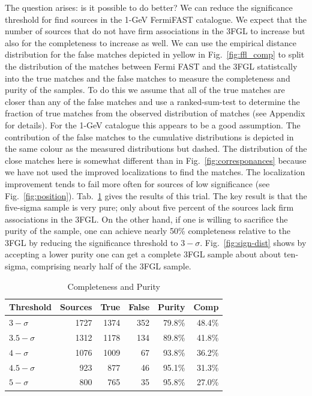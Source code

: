 \documentclass[useAMS,usenatbib]{mn2e}
\begin{document}
The question arises: is it possible to do better? We can reduce the
significance threshold for find sources in the 1-GeV FermiFAST
catalogue.  We expect that the number of sources that do not have firm
associations in the 3FGL to increase but also for the completeness to
increase as well.  We can use the empirical distance distribution for
the false matches depicted in yellow in Fig.~\ref{fig:ffl_comp} to
split the distribution of the matches between Fermi FAST and the 3FGL
statistcally into the true matches and the false matches to measure
the completeness and purity of the samples.  To do this we assume that
all of the true matches are closer than any of the false matches and
use a ranked-sum-test to determine the fraction of true matches
from the observed distribution of matches (see Appendix for details).  For
the 1-GeV catalogue this appears to be a good assumption.  The
contribution of the false matches to the cumulative distributions is
depicted in the same colour as the measured distributions but dashed.
The distribution of the close matches here is somewhat different than
in Fig.~\ref{fig:corresponances} because we have not used the improved
localizations to find the matches.  The localization improvement tends
to fail more often for sources of low significance (see
Fig.~\ref{fig:position}).  Tab.~\ref{tab:comppure} gives the results
of this trial.  The key result is that the five-sigma sample is very
pure; only about five percent of the sources lack firm associations in
the 3FGL.  On the other hand, if one is willing to sacrifice the
purity of the sample, one can achieve nearly 50\% completeness
relative to the 3FGL by reducing the significance threshold to
$3-\sigma$.  Fig.~\ref{fig:sign-dist} shows by accepting a lower
purity one can get a complete 3FGL sample about about ten-sigma,
comprising nearly half of the 3FGL sample.
\begin{table}
  \caption{Completeness and Purity}
  \label{tab:comppure}
  \begin{tabular}{l|rrrrr}
    \hline
    Threshold & \multicolumn{1}{c}{Sources} & \multicolumn{1}{c}{True} & \multicolumn{1}{c}{False} & \multicolumn{1}{c}{Purity} & \multicolumn{1}{c}{Comp} \\
    \hline
    $3-\sigma$   & 1727 & 1374 & 352 & 79.8\% & 48.4\% \\
    $3.5-\sigma$ & 1312 & 1178 & 134 & 89.8\% & 41.8\% \\
    $4-\sigma$   & 1076 & 1009 &  67 & 93.8\% & 36.2\% \\
    $4.5-\sigma$ &  923 &  877 &  46 & 95.1\% & 31.3\% \\
    $5-\sigma$   &  800 &  765 &  35 & 95.8\% & 27.0\%  
  \end{tabular}
\end{table}
\end{document}
